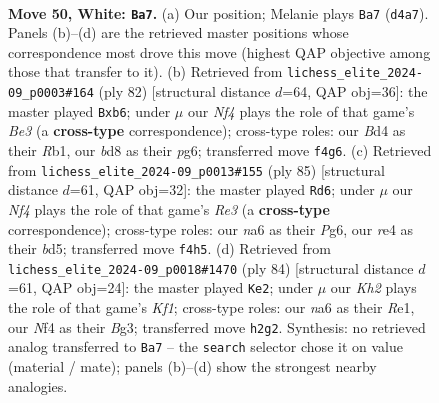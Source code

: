 \documentclass[11pt]{article}
\begin{document}
\clearpage

\begin{figure}[p]\centering
\begin{subfigure}{0.46\textwidth}\centering
\resizebox{\linewidth}{!}{%
\newchessgame
\chessboard[
  setfen={1rkb4/1p5p/n5pP/p4p2/P2BrN2/3R2P1/7K/6R1 w - - 7 50},
  showmover=false,
  pgfstyle=straightmove, color=movearrow, markmove={d4-a7}
]}
\caption{}
\end{subfigure}\hfill
\begin{subfigure}{0.46\textwidth}\centering
\resizebox{\linewidth}{!}{%
\newchessgame
\chessboard[
  setfen={8/3r1kb1/1p4p1/4pp2/P7/3rB1P1/5P2/1R2R1K1 w - - 0 42},
  showmover=false,
  pgfstyle=straightmove, color=movearrow, markmove={e3-b6}
]}
\caption{}
\end{subfigure}
\\[4pt]
\begin{subfigure}{0.46\textwidth}\centering
\resizebox{\linewidth}{!}{%
\newchessgame
\chessboard[
  setfen={7r/R4R2/4rbpk/3B3p/2Pp3P/3P2PK/8/8 b - - 9 43},
  showmover=false,
  pgfstyle=straightmove, color=movearrow, markmove={e6-d6}
]}
\caption{}
\end{subfigure}\hfill
\begin{subfigure}{0.46\textwidth}\centering
\resizebox{\linewidth}{!}{%
\newchessgame
\chessboard[
  setfen={8/3n4/1pbP4/p1p2k1p/P1P1p1r1/4R1B1/5P2/4RK2 w - - 0 43},
  showmover=false,
  pgfstyle=straightmove, color=movearrow, markmove={f1-e2}
]}
\caption{}
\end{subfigure}
\caption{\textbf{Move 50, White: \texttt{Ba7}.} (a) Our position; Melanie plays \texttt{Ba7} (\texttt{d4a7}). Panels (b)--(d) are the retrieved master positions whose correspondence most drove this move (highest QAP objective among those that transfer to it). (b) Retrieved from \texttt{lichess\_elite\_2024-09\_p0003\#164} (ply 82) [structural distance $d$=64, QAP obj=36]: the master played \texttt{Bxb6}; under $\mu$ our \emph{Nf4} plays the role of that game's \emph{Be3} (a \textbf{cross-type} correspondence); cross-type roles: our \emph{B}d4 as their \emph{R}b1, our \emph{b}d8 as their \emph{p}g6; transferred move \texttt{f4g6}. (c) Retrieved from \texttt{lichess\_elite\_2024-09\_p0013\#155} (ply 85) [structural distance $d$=61, QAP obj=32]: the master played \texttt{Rd6}; under $\mu$ our \emph{Nf4} plays the role of that game's \emph{Re3} (a \textbf{cross-type} correspondence); cross-type roles: our \emph{n}a6 as their \emph{P}g6, our \emph{r}e4 as their \emph{b}d5; transferred move \texttt{f4h5}. (d) Retrieved from \texttt{lichess\_elite\_2024-09\_p0018\#1470} (ply 84) [structural distance $d$=61, QAP obj=24]: the master played \texttt{Ke2}; under $\mu$ our \emph{Kh2} plays the role of that game's \emph{Kf1}; cross-type roles: our \emph{n}a6 as their \emph{R}e1, our \emph{N}f4 as their \emph{B}g3; transferred move \texttt{h2g2}. Synthesis: no retrieved analog transferred to \texttt{Ba7} -- the \texttt{search} selector chose it on value (material / mate); panels (b)--(d) show the strongest nearby analogies.}
\label{fig:thought-m98}
\end{figure}
\end{document}
